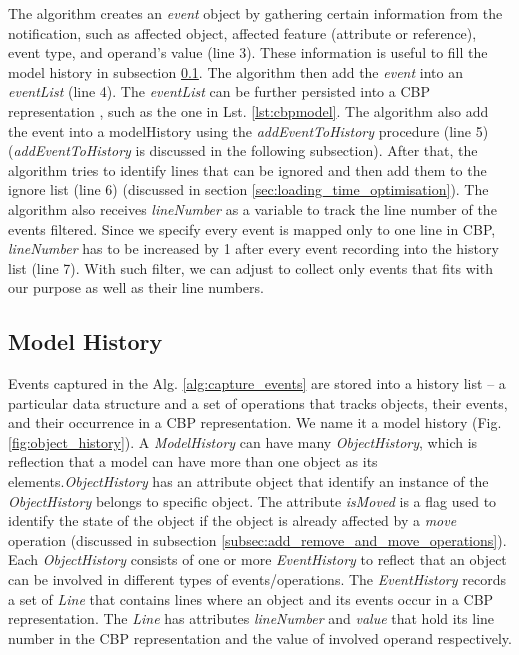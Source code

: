 \documentclass[sigconf]{acmart}
\begin{document}
The algorithm creates an \emph{event} object by gathering certain information from the notification, such as affected object, affected feature (attribute or reference), event type, and operand's value (line 3). These information is useful to fill the model history in subsection \ref{sec:model_history}. The algorithm then add the \emph{event} into an \emph{eventList} (line 4). The \emph{eventList} can be further persisted into a CBP representation  \cite{yohannis2017turning}, such as the one in Lst. \ref{lst:cbpmodel}. The algorithm also add the event into a modelHistory using the \emph{addEventToHistory} procedure (line 5) (\emph{addEventToHistory} is discussed in the following subsection). After that, the algorithm tries to identify lines that can be ignored and then add them to the ignore list (line 6) (discussed in section \ref{sec:loading_time_optimisation}). The algorithm also receives \emph{lineNumber} as a variable to track the line number of the events filtered. Since we specify every event is mapped only to one line in CBP, \emph{lineNumber} has to be increased by 1 after every event recording into the history list (line 7). With such filter, we can adjust to collect only events that fits with our purpose as well as their line numbers.

\subsection{Model History}
\label{sec:model_history}
Events captured in the Alg. \ref{alg:capture_events} are stored into a  history list -- a particular data structure and a set of operations that tracks objects, their events, and their  occurrence in a CBP representation. We name it a model history (Fig. \ref{fig:object_history}). A \emph{ModelHistory} can have many \emph{ObjectHistory}, which is reflection that a model can have more than one object as its elements.\emph{ObjectHistory} has an attribute object that identify an instance of the \emph{ObjectHistory} belongs to specific object. The attribute \emph{isMoved} is a flag used to identify the state of the object if the object is already affected by a \emph{move} operation (discussed in subsection \ref{subsec:add_remove_and_move_operations}). Each \emph{ObjectHistory} consists of one or more \emph{EventHistory} to reflect that an object can be involved in different types of events/operations. The \emph{EventHistory} records a set of \emph{Line} that contains lines where an object and its events occur in a CBP representation. The \emph{Line} has attributes \emph{lineNumber} and \emph{value} that hold its line number in the CBP representation and the value of involved operand respectively.
\end{document}
